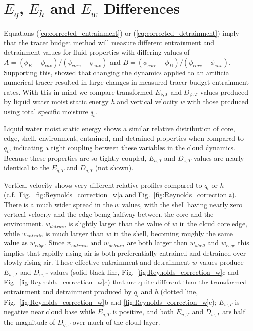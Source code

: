 \documentclass[12pt]{article}
\begin{document}

\section{$E_q$, $E_h$ and $E_w$ Differences}

Equations (\ref{eq:corrected_entrainment}) or 
(\ref{eq:corrected_detrainment}) imply that the tracer budget method will 
measure different entrainment and detrainment values for fluid properties 
with differing values of 
$A = (\phi_E - \phi_{env})/(\phi_{core} - \phi_{env})$ and
$B = (\phi_{core} - \phi_D)/(\phi_{core} - \phi_{env})$.  
Supporting this, \citet[Figure 2]{Romps2010} showed that changing the 
dynamics applied to an artificial numerical tracer resulted in large 
changes in measured tracer budget entrainment rates. With this in mind 
we compare transformed $E_{\phi,T}$ and $D_{\phi,T}$ values produced by 
liquid water moist static energy $h$ and vertical velocity $w$ with those
produced using total specific moisture $q_t$.

Liquid water moist static energy shows a similar relative distribution of 
core, edge, shell, environment, entrained, and detrained properties when 
compared to $q_t$, indicating a tight coupling between these variables in 
the cloud dynamics.  Because these properties are so tightly coupled, 
$E_{h,T}$ and $D_{h,T}$ values are nearly identical to the $E_{q,T}$ and 
$D_{q,T}$ (not shown).

Vertical velocity shows very different relative profiles compared to
$q_t$ or $h$ (c.f.~Fig.~\ref{fig:Reynolds_correction_w}a and 
Fig.~\ref{fig:Reynolds_correction}a).  There is a
much wider spread in the $w$ values, with the shell having nearly zero
vertical velocity and the edge being halfway between the core and the
environment.  $w_{detrain}$ is slightly larger than the value of $w$
in the cloud core edge, while $w_{entrain}$ is much larger than $w$ in
the shell, becoming roughly the same value as $w_{edge}$.  Since
$w_{entrain}$ and $w_{detrain}$ are both larger than $w_{shell}$ and
$w_{edge}$ this implies that rapidly rising air is both preferentially
entrained and detrained over slowly rising air.  These effective
entrainment and detrainment $w$ values produce $E_{w,T}$ and $D_{w,T}$
values (solid black line, Fig.~\ref{fig:Reynolds_correction_w}c and 
Fig.~\ref{fig:Reynolds_correction_w}c) that are quite different than the 
transformed entrainment and detrainment produced by $q_t$ and $h$
(dotted line, Fig.~\ref{fig:Reynolds_correction_w}b and 
\ref{fig:Reynolds_correction_w}c); $E_{w,T}$ is negative near cloud base
while $E_{q,T}$ is positive, and both $E_{w,T}$ and $D_{w,T}$ are half 
the magnitude of $D_{q,T}$ over much of the cloud layer.
\end{document}
